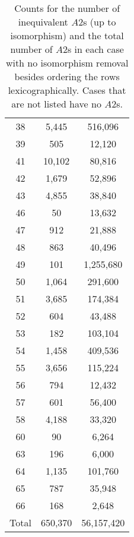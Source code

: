\documentclass[letterpaper]{article}
\begin{document}
\begin{table}
\begin{tabular}{ccc}
    38 & \hfill    5,445 & \hfill 516,096 \\ 
    39 & \hfill      505 & \hfill  12,120 \\ 
    41 & \hfill   10,102 & \hfill  80,816 \\ 
    42 & \hfill    1,679 & \hfill  52,896 \\ 
    43 & \hfill    4,855 & \hfill  38,840 \\ 
    46 & \hfill       50 & \hfill  13,632 \\ 
    47 & \hfill      912 & \hfill  21,888 \\ 
    48 & \hfill      863 & \hfill  40,496 \\ 
    49 & \hfill      101 & \hfill1,255,680 \\ 
    50 & \hfill    1,064 & \hfill 291,600 \\ 
    51 & \hfill    3,685 & \hfill 174,384 \\ 
    52 & \hfill      604 & \hfill  43,488 \\ 
    53 & \hfill      182 & \hfill 103,104 \\ 
    54 & \hfill    1,458 & \hfill 409,536 \\ 
    55 & \hfill    3,656 & \hfill 115,224 \\ 
    56 & \hfill      794 & \hfill  12,432 \\ 
    57 & \hfill      601 & \hfill  56,400 \\ 
    58 & \hfill    4,188 & \hfill  33,320 \\ 
    60 & \hfill       90 & \hfill   6,264 \\ 
    63 & \hfill      196 & \hfill   6,000 \\ 
    64 & \hfill    1,135 & \hfill 101,760 \\ 
    65 & \hfill      787 & \hfill  35,948 \\ 
    66 & \hfill      168 & \hfill   2,648 \\ 
Total & \hfill  650,370 & \hfill56,157,420
\end{tabular}
\caption*{Counts for the number of inequivalent $A2$s (up to isomorphism)
and the total number of $A2$s in each case with no isomorphism removal
besides ordering the rows lexicographically.
Cases that are not listed have no $A2$s.}
\end{table}
\end{document}
